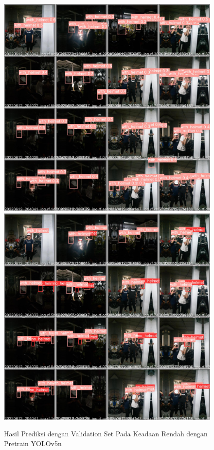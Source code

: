 \begin{figure}[ht]
  \centering
  \includegraphics[scale=0.1]{gambar/train_v2_val/low_ligjt/yolonano/val_batch0_pred.jpg}
  \includegraphics[scale=0.1]{gambar/train_v2_val/low_ligjt/yolonano/val_batch0_labels.jpg}
  \caption{Hasil Prediksi dengan Validation Set Pada Keadaan Rendah dengan Pretrain YOLOv5n}
\end{figure}

